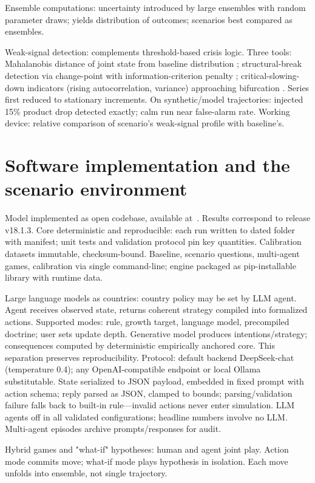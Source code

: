 \documentclass[a4paper,fleqn]{cas-sc}
\begin{document}
Ensemble computations: uncertainty introduced by large ensembles with random parameter draws; yields distribution of outcomes; scenarios best compared as ensembles.

Weak-signal detection: complements threshold-based crisis logic. Three tools: Mahalanobis distance of joint state from baseline distribution \citep{mahalanobis1936,wilson1931}; structural-break detection via change-point with information-criterion penalty \citep{schwarz1978}; critical-slowing-down indicators (rising autocorrelation, variance) approaching bifurcation \citep{scheffer2009}. Series first reduced to stationary increments. On synthetic/model trajectories: injected 15\% product drop detected exactly; calm run near false-alarm rate. Working device: relative comparison of scenario's weak-signal profile with baseline's.

\section{Software implementation and the scenario environment}
\label{sec:repo}

Model implemented as open codebase, available at~\citep{theclimateguy2026gim}. Results correspond to release v18.1.3. Core deterministic and reproducible: each run written to dated folder with manifest; unit tests and validation protocol pin key quantities. Calibration datasets immutable, checksum-bound. Baseline, scenario questions, multi-agent games, calibration via single command-line; engine packaged as pip-installable library with runtime data.

Large language models as countries: country policy may be set by LLM agent. Agent receives observed state, returns coherent strategy compiled into formalized actions. Supported modes: rule, growth target, language model, precompiled doctrine; user sets update depth. Generative model produces intentions/strategy; consequences computed by deterministic empirically anchored core. This separation preserves reproducibility. Protocol: default backend DeepSeek-chat (temperature 0.4); any OpenAI-compatible endpoint or local Ollama substitutable. State serialized to JSON payload, embedded in fixed prompt with action schema; reply parsed as JSON, clamped to bounds; parsing/validation failure falls back to built-in rule---invalid actions never enter simulation. LLM agents off in all validated configurations; headline numbers involve no LLM. Multi-agent episodes archive prompts/responses for audit.

Hybrid games and "what-if" hypotheses: human and agent joint play. Action mode commits move; what-if mode plays hypothesis in isolation. Each move unfolds into ensemble, not single trajectory.
\end{document}
